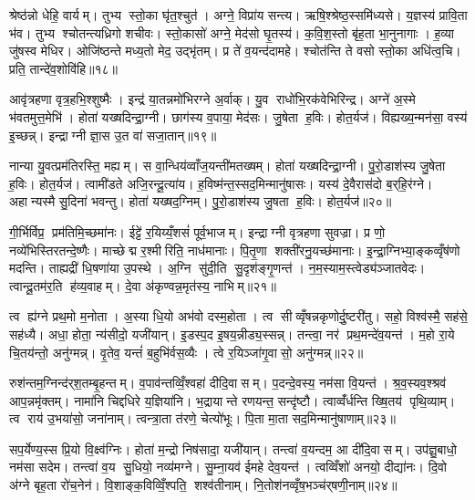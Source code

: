 श्रेष्ठ॑न्नो धेहि॒ वार्यम्। तुभ्य स्तो॒का घृ॑त॒श्चुत॑। अग्ने॒ विप्रा॑य सन्त्य। ऋषि॒श्श्रेष्ठ॒स्समि॑ध्यसे। य॒ज्ञस्य॑ प्रावि॒ता भ॑व। तुभ्य श्चोतन्त्यध्रिगो शचीवः। स्तो॒कासो॑ अग्ने॒ मेद॑सो घृ॒तस्य॑। क॒वि॒श॒स्तो बृ॑ह॒ता भा॒नुनागाः। ह॒व्या जु॑षस्व मेधिर। ओजि॑ष्ठन्ते मध्य॒तो मेद॒ उद्भृ॑तम्। प्र ते॑ व॒यन्द॑दामहे। श्चोत॑न्ति ते वसो स्तो॒का अधि॑त्व॒चि। प्रति॒ तान्दे॑व॒शोवि॑हि॥१८॥\anuvakamend[दे॒ववी॑तय॒ उद्भृ॑त॒न्त्रीणि॑ च]

आवृ॑त्रहणा वृत्र॒हभि॒श्शुष्मैः। इन्द्र॑ या॒तन्नमो॑भिरग्ने अ॒र्वाक्। यु॒व राधो॑भि॒रक॑वेभिरिन्द्र। अग्ने॑ अ॒स्मे भ॑वतमुत्त॒मेभि॑। होता॑ यख्षदिन्द्रा॒ग्नी। छाग॑स्य व॒पाया॒ मेद॑सः। जु॒षेता ह॒विः। होत॒र्यज॑। विह्यख्य॒न्मन॑सा॒ वस्य॑ इ॒च्छन्न्। इन्द्राग्नी ज्ञा॒स उ॒त वा॑ सजा॒तान्॥१९॥

नान्या यु॒वत्प्रम॑तिरस्ति॒ मह्यम्। स वा॒न्धिय॑व्वाँज॒यन्ती॑मतख्षम्। होता॑ यख्षदिन्द्रा॒ग्नी। पु॒रो॒डाश॑स्य जु॒षेता ह॒विः। होत॒र्यज॑। त्वामी॑डते अजि॒रन्दू॒त्या॑य। ह॒विष्म॑न्त॒स्सद॒मिन्मानु॑षासः। यस्य॑ दे॒वैरास॑दो ब॒र्‌हि॒र॑ग्ने। अहान्यस्मै सु॒दिना॑ भवन्तु। होता॑ यख्षद॒ग्निम्। पु॒रो॒डाश॑स्य जु॒षता ह॒विः। होत॒र्यज॑॥२०॥\anuvakamend[स॒जा॒तान॒ग्निन्द्वे च॑]

गी॒र्भिर्विप्र॒ प्रम॑तिमि॒च्छमा॑नः। ईट्टे॑ र॒यिय्यँ॒शसं॑ पूर्व॒भाजम्। इन्द्राग्नी वृत्रहणा सुवज्रा। प्र णो॒ नव्ये॑भिस्तिरतन्दे॒ष्णैः। माच्छेद्म र॒श्मीरिति॒ नाध॑मानाः। पि॒तृ॒णा शक्ती॑रनु॒यच्छ॑मानाः। इ॒न्द्रा॒ग्निभ्या॒ङ्कव्वृँष॑णो मदन्ति। ताह्यद्री॑ धि॒षणा॑या उ॒पस्थे। अ॒ग्नि सु॑दी॒ति सु॒दृश॑ङ्गृ॒णन्त॑। न॒म॒स्याम॒स्त्वेड्य॑ञ्जातवेदः। त्वान्दू॒तम॑र॒ति ह॑व्य॒वाहम्। दे॒वा अ॑कृण्वन्न॒मृत॑स्य॒ नाभिम्॥२१॥\anuvakamend[जा॒त॒वे॒दो॒ द्वे च॑]

त्व ह्य॑ग्ने प्रथ॒मो म॒नोता। अ॒स्या धि॒यो अभ॑वो दस्म॒होता। त्व सीव्वृँषन्नकृणोर्दु॒ष्टरी॑तु। सहो॒ विश्व॑स्मै॒ सह॑से॒ सह॑ध्यै। अधा॒ होता॒ न्य॑सीदो॒ यजी॑यान्। इ॒डस्प॒द इ॒षय॒न्नीड्य॒स्सन्न्। तन्त्वा॒ नर॑ प्रथ॒मन्दे॑व॒यन्त॑। म॒हो रा॒ये चि॒तय॑न्तो॒ अनु॑ग्मन्न्। वृ॒तेव॒ यन्तं॑ ब॒हुभि॑र्वस॒व्यैः। त्वे र॒यिञ्जा॑गृ॒वासो॒ अनु॑ग्मन्न्॥२२॥

रुश॑न्तम॒ग्निन्द॑र्‌श॒तम्बृ॒हन्तम्। व॒पाव॑न्तव्विँ॒श्वहा॑ दीदि॒वासम्। प॒दन्दे॒वस्य॒ नम॑सा वि॒यन्त॑। श्र॒व॒स्यव॒श्श्रव॑ आप॒न्नमृ॑क्तम्। नामा॑नि चिद्दधिरे य॒ज्ञिया॑नि। भ॒द्रायान्ते रणयन्त॒ सन्दृ॑ष्टौ। त्वाव्वँ॑र्धन्ति ख्षि॒तय॑ पृथि॒व्याम्। त्व राय॑ उ॒भया॑सो॒ जना॑नाम्। त्वन्त्रा॒ता त॑रणे॒ चेत्यो॑भूः। पि॒ता मा॒ता सद॒मिन्मानु॑षाणाम्॥२३॥

सप॒र्येण्य॒स्स प्रि॒यो वि॒क्ष्व॑ग्निः। होता॑ म॒न्द्रो निष॑सादा॒ यजी॑यान्। तन्त्वा॑ व॒यन्दम॒ आ दी॑दि॒वासम्। उप॑ज्ञु॒बाधो॒ नम॑सा सदेम। तन्त्वा॑ व॒य सु॒धियो॒ नव्य॑मग्ने। सु॒म्ना॒यव॑ ईमहे देव॒यन्त॑। त्वव्विँशो॑ अनयो॒ दीद्या॑नः। दि॒वो अ॑ग्ने बृह॒ता रो॑च॒नेन॑। वि॒शाङ्क॒विव्विँ॒श्पति॒ शश्व॑तीनाम्। नि॒तोश॑नव्वृँष॒भञ्च॑र्‌षणी॒नाम्॥२४॥

